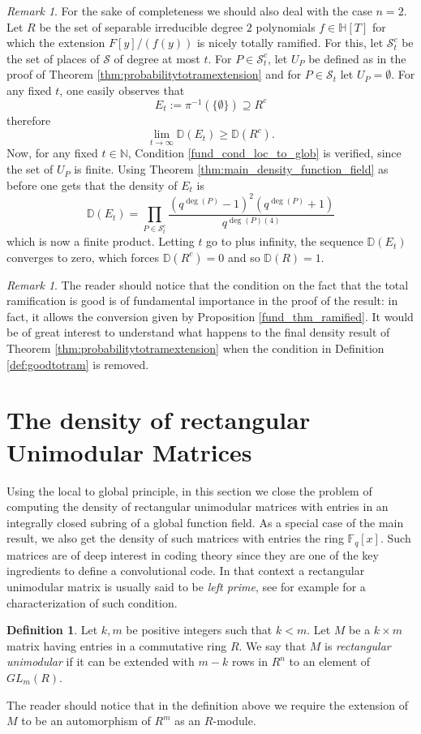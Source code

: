 \documentclass[10pt]{amsart}
\newcommand{\vF}{\mathbb{F}}
\newcommand{\vN}{\mathbb{N}}
\newcommand{\vH}{\mathbb{H}}
\newcommand{\vD}{\mathbb{D}}
\newcommand{\cS}{\mathcal{S}}
\theoremstyle{definition}
\newtheorem{definition}[theorem]{Definition}
\theoremstyle{remark}
\newtheorem{remark}[theorem]{Remark}
\numberwithin{equation}{section}
\begin{document}
\begin{remark}
For the sake of completeness we should also deal with the case $n=2$.
Let $R$ be the set of separable irreducible degree $2$ polynomials $f\in \vH[T]$ for which the extension $F[y]/(f(y))$ is nicely totally ramified. 
For this, let $\cS_t^c$ be the set of places of $\cS$ of degree at most $t$. For $P\in \cS_t^c$, let $U_P$ be defined as in the proof of Theorem \ref{thm:probabilitytotramextension}  and for $P\in \cS_t$ let $U_P=\emptyset$. For any fixed $t$, one easily observes that 
\[E_t:=\pi^{-1}(\{\emptyset\})\supseteq R^{c}\]
therefore 
\begin{equation}\label{eq:deg2}
\lim_{t\rightarrow \infty } \vD(E_t)\geq \vD(R^{c}).
\end{equation}
Now, for any fixed $t\in \vN$, Condition \eqref{fund_cond_loc_to_glob} is verified, since the set of $U_P$ is finite.
Using Theorem \ref{thm:main_density_function_field} as before one gets that the density of $E_t$ is
\[\vD(E_t)=\prod_{P\in \cS_t^c} \frac{(q^{\deg(P)}-1)^2(q^{\deg(P)}+1)}{q^{\deg(P)(4)}}\]
which is now a finite product.
Letting $t$ go to plus infinity, the sequence $\vD(E_t)$ converges to zero, which forces $\vD(R^c)=0$ and so 
$\vD(R)=1$.
\end{remark}
\begin{remark}
The reader should notice that the condition on the fact that the total ramification is good is of fundamental importance in the proof of the result: in fact,  it allows the conversion given by Proposition \ref{fund_thm_ramified}. It would be of great interest to understand what happens to the final density result of Theorem \ref{thm:probabilitytotramextension} when the condition in Definition \ref{def:goodtotram} is removed.
\end{remark}

\section{The density of rectangular Unimodular Matrices}\label{sec:unimodularmatrices}

Using the local to global principle, in this section we close the problem of computing the density of rectangular unimodular matrices with entries in an integrally closed subring of a global function field. As a special case of the main result, we also get the density of such matrices with entries the ring $\vF_q[x]$. Such matrices are of deep interest in coding theory since they are one of the key ingredients to define a convolutional code. In that context a rectangular unimodular matrix is usually said to be \emph{left prime}, see for example \cite[pg 122]{FORNASINI2004119} for a characterization of such condition.
\begin{definition}
Let $k,m$ be positive integers such that $k<m$. Let $M$ be a $k\times m$ matrix having entries in a commutative ring $R$.
We say that $M$ is \emph{rectangular unimodular} if it can be extended with $m-k$ rows in $R^n$ to an element of $GL_m(R)$. 
\end{definition}
The reader should notice that in the definition above we require the extension of $M$ to be an automorphism of $R^m$ as an $R$-module. 
\end{document}
